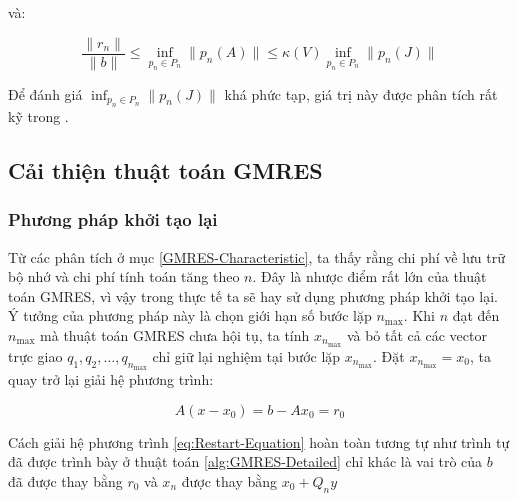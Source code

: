 \documentclass[14pt, a4paper]{article}
\numberwithin{equation}{section}
\numberwithin{algorithm}{section}
\numberwithin{figure}{section}
\numberwithin{dl}{section}
\numberwithin{md}{section}
\numberwithin{bd}{section}
\begin{document}
và:

\begin{equation}
    \dfrac{\lVert r_n \rVert}{\lVert b \rVert} \leq \inf_{p_n \in P_n} \lVert p_n(A) \rVert \leq \kappa(V) \inf_{p_n \in P_n} \lVert p_n(J) \rVert
\end{equation}

Để đánh giá $\inf_{p_n \in P_n} \lVert p_n(J) \rVert$ khá phức tạp, giá trị này được phân tích rất kỹ trong \cite{tichy2005worst}.


\subsection{Cải thiện thuật toán GMRES}

\subsubsection{Phương pháp khởi tạo lại}

Từ các phân tích ở mục \ref{GMRES-Characteristic}, ta thấy rằng chi phí về lưu trữ bộ nhớ và chi phí tính toán tăng theo $n$. Đây là nhược điểm rất lớn của thuật toán GMRES, vì vậy trong thực tế ta sẽ hay sử dụng phương pháp khởi tạo lại.
Ý tưởng của phương pháp này là chọn giới hạn số bước lặp $n_{\max}$. Khi $n$ đạt đến $n_{\max}$ mà thuật toán GMRES chưa hội tụ, ta tính $x_{n_{\max}}$ và bỏ tất cả các vector trực giao $q_1, q_2, \dots, q_{n_{\max}}$ chỉ giữ lại nghiệm tại bước lặp $x_{n_{\max}}$. Đặt $x_{n_{\max}}=x_0$, ta quay trở lại giải hệ phương trình:

\begin{equation} \label{eq:Restart-Equation}
    A(x - x_0) = b - A x_0 = r_0
\end{equation}

Cách giải hệ phương trình \ref{eq:Restart-Equation} hoàn toàn tương tự như trình tự đã được trình bày ở thuật toán \ref{alg:GMRES-Detailed} chỉ khác là vai trò của $b$ đã được thay bằng $r_0$ và $x_n$ được thay bằng $x_0+Q_n y$
\end{document}
